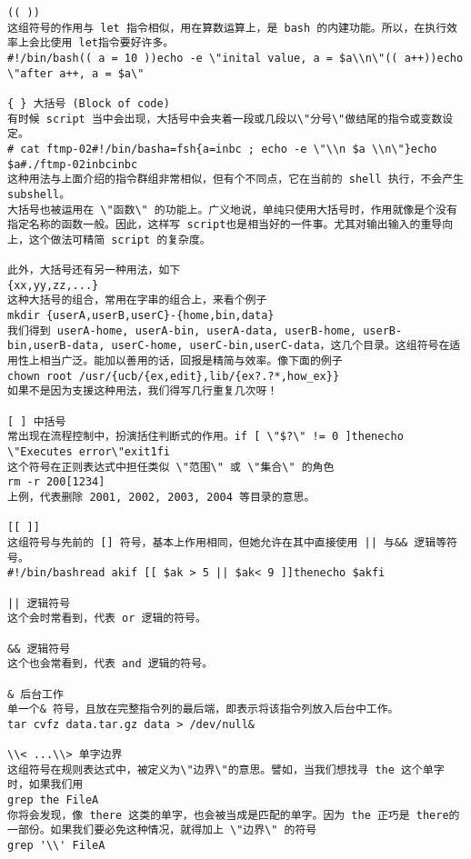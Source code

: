 \begin{lstlisting}
(( ))
这组符号的作用与 let 指令相似，用在算数运算上，是 bash 的内建功能。所以，在执行效率上会比使用 let指令要好许多。
#!/bin/bash(( a = 10 ))echo -e \"inital value, a = $a\\n\"(( a++))echo \"after a++, a = $a\"

{ } 大括号 (Block of code)
有时候 script 当中会出现，大括号中会夹着一段或几段以\"分号\"做结尾的指令或变数设定。
# cat ftmp-02#!/bin/basha=fsh{a=inbc ; echo -e \"\\n $a \\n\"}echo $a#./ftmp-02inbcinbc
这种用法与上面介绍的指令群组非常相似，但有个不同点，它在当前的 shell 执行，不会产生 subshell。
大括号也被运用在 \"函数\" 的功能上。广义地说，单纯只使用大括号时，作用就像是个没有指定名称的函数一般。因此，这样写 script也是相当好的一件事。尤其对输出输入的重导向上，这个做法可精简 script 的复杂度。

此外，大括号还有另一种用法，如下
{xx,yy,zz,...}
这种大括号的组合，常用在字串的组合上，来看个例子
mkdir {userA,userB,userC}-{home,bin,data}
我们得到 userA-home, userA-bin, userA-data, userB-home, userB-bin,userB-data, userC-home, userC-bin,userC-data，这几个目录。这组符号在适用性上相当广泛。能加以善用的话，回报是精简与效率。像下面的例子
chown root /usr/{ucb/{ex,edit},lib/{ex?.?*,how_ex}}
如果不是因为支援这种用法，我们得写几行重复几次呀！

[ ] 中括号
常出现在流程控制中，扮演括住判断式的作用。if [ \"$?\" != 0 ]thenecho \"Executes error\"exit1fi
这个符号在正则表达式中担任类似 \"范围\" 或 \"集合\" 的角色
rm -r 200[1234]
上例，代表删除 2001, 2002, 2003, 2004 等目录的意思。

[[ ]]
这组符号与先前的 [] 符号，基本上作用相同，但她允许在其中直接使用 || 与&& 逻辑等符号。
#!/bin/bashread akif [[ $ak > 5 || $ak< 9 ]]thenecho $akfi

|| 逻辑符号
这个会时常看到，代表 or 逻辑的符号。

&& 逻辑符号
这个也会常看到，代表 and 逻辑的符号。

& 后台工作
单一个& 符号，且放在完整指令列的最后端，即表示将该指令列放入后台中工作。
tar cvfz data.tar.gz data > /dev/null&

\\< ...\\> 单字边界
这组符号在规则表达式中，被定义为\"边界\"的意思。譬如，当我们想找寻 the 这个单字时，如果我们用
grep the FileA
你将会发现，像 there 这类的单字，也会被当成是匹配的单字。因为 the 正巧是 there的一部份。如果我们要必免这种情况，就得加上 \"边界\" 的符号
grep '\\' FileA


\end{lstlisting}
